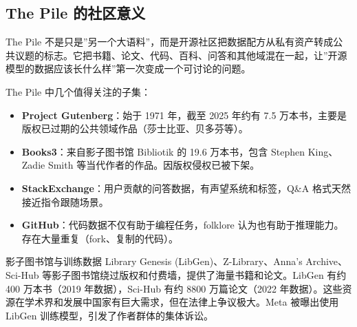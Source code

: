 \subsection{The Pile 的社区意义}

The Pile 不是只是”另一个大语料”，而是开源社区把数据配方从私有资产转成公共议题的标志。它把书籍、论文、代码、百科、问答和其他域混在一起，让”开源模型的数据应该长什么样”第一次变成一个可讨论的问题。

The Pile 中几个值得关注的子集：
\begin{itemize}
    \item \textbf{Project Gutenberg}：始于 1971 年，截至 2025 年约有 7.5 万本书，主要是版权已过期的公共领域作品（莎士比亚、贝多芬等）。
    \item \textbf{Books3}：来自影子图书馆 Bibliotik 的 19.6 万本书，包含 Stephen King、Zadie Smith 等当代作者的作品。因版权侵权已被下架。
    \item \textbf{StackExchange}：用户贡献的问答数据，有声望系统和标签，Q\&A 格式天然接近指令跟随场景。
    \item \textbf{GitHub}：代码数据不仅有助于编程任务，folklore 认为也有助于推理能力。存在大量重复（fork、复制的代码）。
\end{itemize}

\begin{knowledgebox}{影子图书馆与训练数据}
Library Genesis (LibGen)、Z-Library、Anna's Archive、Sci-Hub 等影子图书馆绕过版权和付费墙，提供了海量书籍和论文。LibGen 有约 400 万本书（2019 年数据），Sci-Hub 有约 8800 万篇论文（2022 年数据）。这些资源在学术界和发展中国家有巨大需求，但在法律上争议极大。Meta 被曝出使用 LibGen 训练模型，引发了作者群体的集体诉讼。
\end{knowledgebox}

